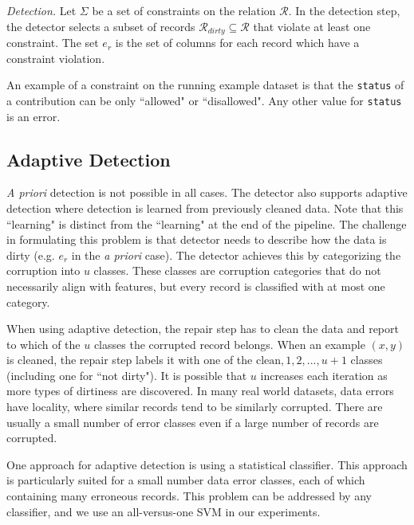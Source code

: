 \vspace{0.5em}

\emph{Detection. } Let $\Sigma$ be a set of constraints on the relation $\mathcal{R}$. 
In the detection step, the detector selects a subset of records $\mathcal{R}_{dirty} \subseteq \mathcal{R}$ that violate at least one constraint.
The set $e_r$ is the set of columns for each record which have a constraint violation. 

\begin{example}\label{detex1}
An example of a constraint on the running example dataset is that the \texttt{status} of
a contribution can be only ``allowed" or ``disallowed".
Any other value for \texttt{status} is an error.
\end{example}

\subsection{Adaptive Detection}
\emph{A priori} detection is not possible in all cases.
The detector also supports adaptive detection where detection is learned from previously cleaned data.
Note that this ``learning" is distinct from the ``learning" at the end of the pipeline.
The challenge in formulating this problem is that detector needs to describe how the data is dirty (e.g. $e_r$ in the \emph{a priori} case).
The detector achieves this by categorizing the corruption into $u$ classes.
These classes are corruption categories that do not necessarily align with features, but every record is classified with at most one category.

When using adaptive detection, the repair step has to clean the data and report to which of the $u$ classes the corrupted record belongs.
When an example $(x,y)$ is cleaned, the repair step labels it with one of the ${\text{clean}, 1,2,...,u+1}$ classes (including one for ``not dirty").
It is possible that $u$ increases each iteration as more types of dirtiness are discovered.
In many real world datasets, data errors have locality, where similar records tend to be similarly corrupted.
There are usually a small number of error classes even if a large number of records are corrupted.

One approach for adaptive detection is using a statistical classifier. 
This approach is particularly suited for a small number data error classes, each of which containing many erroneous records.
This problem can be addressed by any classifier, and we use an all-versus-one SVM in our experiments.

